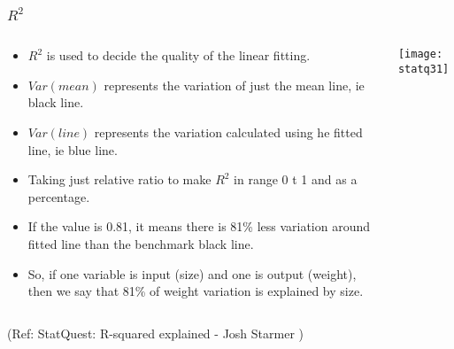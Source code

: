 \begin{frame}[fragile]\frametitle{$R^2$}

\begin{columns}
    \begin{column}[T]{0.6\linewidth}
	\begin{itemize}
	\item $R^2$ is used to decide the quality of the linear fitting.
	\item $Var(mean)$ represents the variation of just the mean line, ie black line.
	\item $Var(line)$ represents the variation calculated using he fitted line, ie blue line.
	\item Taking just relative ratio to make $R^2$ in range 0 t 1 and as a percentage.
	\item If the value is 0.81, it means there is 81\% less variation around fitted line than the benchmark black line.
	\item So, if one variable is input (size) and one is output (weight), then we say that 81\% of weight variation is explained by size.
	\end{itemize}

    \end{column}
    \begin{column}[T]{0.4\linewidth}
      \begin{center}
      \texttt{[image: statq31]}
	  
	   
	  	\end{center}
    \end{column}

  \end{columns}
  
	
\tiny{(Ref: StatQuest: R-squared explained - Josh Starmer )}
\end{frame}
